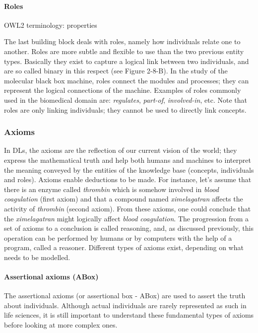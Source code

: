 \paragraph{\textbf{Roles}\\}

OWL2 terminology: properties

The last building block deals with roles, namely how individuals relate one to another. Roles are more subtle and flexible to use than the two previous entity types. Basically they exist to capture a logical link between two individuals, and are so called binary in this respect (see Figure 2-8-B). In the study of the molecular black box machine, roles connect the modules and processes; they can represent the logical connections of the machine. Examples of roles commonly used in the biomedical domain are: \emph{regulates}, \emph{part-of}, \emph{involved-in}, etc. Note that roles are only linking individuals; they cannot be used to directly link concepts.

\subsubsection{Axioms}

In DLs, the axioms are the reflection of our current vision of the world; they express the mathematical truth and help both humans and machines to interpret the meaning conveyed by the entities of the knowledge base (concepts, individuals and roles). Axioms enable deductions to be made. For instance, let's assume that there is an enzyme called \emph{thrombin} which is somehow involved in \emph{blood coagulation} (first axiom) and that a compound named \emph{ximelagatran} affects the activity of \emph{thrombin} (second axiom). From these axioms, one could conclude that the \emph{ximelagatran} might logically affect \emph{blood coagulation}. The progression from a set of axioms to a conclusion is called reasoning, and, as discussed previously, this operation can be performed by humans or by computers with the help of a program, called a reasoner. Different types of axioms exist, depending on what needs to be modelled.

\paragraph{\textbf{Assertional axioms (ABox)}\\}
The assertional axioms (or assertional box - ABox) are used to assert the truth about individuals. Although actual individuals are rarely represented as such in life sciences, it is still important to understand these fundamental types of axioms before looking at more complex ones.

